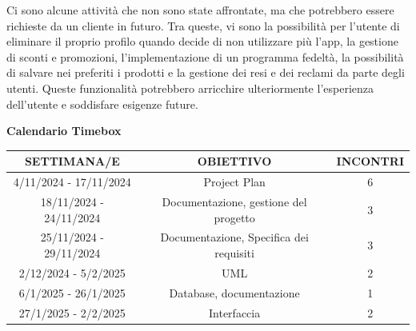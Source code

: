 \documentclass[a4paper,12pt]{article}
\begin{document}
Ci sono alcune attività che non sono state affrontate, ma che potrebbero essere richieste da un cliente in futuro. Tra queste, vi sono la possibilità per l'utente di eliminare il proprio profilo quando decide di non utilizzare più l'app, la gestione di sconti e promozioni, l'implementazione di un programma fedeltà, la possibilità di salvare nei preferiti i prodotti e la gestione dei resi e dei reclami da parte degli utenti. 
Queste funzionalità potrebbero arricchire ulteriormente l'esperienza dell'utente e soddisfare esigenze future.

\newpage
\begin{center}
\Huge \textbf{Calendario Timebox}
\end{center}

\begin{center}
\begin{tabular}{|c|c|c|}
\hline
\textbf{SETTIMANA/E} & \textbf{OBIETTIVO} & \textbf{INCONTRI } \\
\hline
4/11/2024 - 17/11/2024 & Project Plan & 6 \\
\hline
18/11/2024 - 24/11/2024 & Documentazione, gestione del progetto & 3 \\
\hline
25/11/2024 - 29/11/2024 & Documentazione, Specifica dei requisiti  & 3 \\
\hline
2/12/2024 - 5/2/2025 & UML & 2 \\
\hline
6/1/2025 - 26/1/2025 & Database, documentazione & 1 \\
\hline
27/1/2025 - 2/2/2025 & Interfaccia & 2 \\
\hline

\end{tabular}
\end{center}
\end{document}
